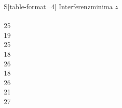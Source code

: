 \begin{table}[H]
  \centering
  \caption{Messwerte zur Bestimmung des Brechungsindex von Luft.}
  \label{tab:Index}
  \begin{tabular}{S[table-format=4]}
    \toprule
    {Interferenzminima $z$ }\\
     \\
    25 \\
    19 \\
    25 \\
    18 \\
    26 \\
    18 \\
    26 \\
    21 \\
    27 \\
    \bottomrule
  \end{tabular}
\end{table}

